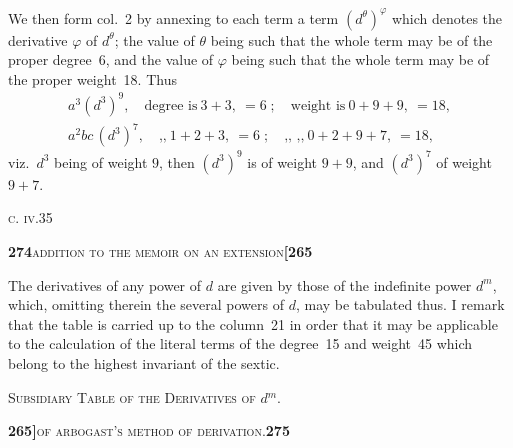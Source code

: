 \documentclass[11pt]{article}
\begin{document}
\medskip

\noindent We then form col.~2 by annexing to each term a term $(d^\theta)^\varphi$ which denotes the derivative $\varphi$ of $d^\theta$; the value of $\theta$ being such that the whole term may be of the proper degree~6, and the value of $\varphi$ being such that the whole term may be of the proper weight~18. Thus
\[
\begin{array}{l}
   a^3(d^3)^9,\quad \text{degree is}\ 3 + 3,\ =6\;;\quad \text{weight is}\ 0 + 9 + 9,\ =18,\\[3pt]
   a^2 b c\,(d^3)^7,\quad \text{,,}\ 1 + 2 + 3,\ =6\;;\quad \text{,, ,,}\ 0 + 2 + 9 + 7,\ =18,
\end{array}
\]
viz.\ $d^3$ being of weight $9$, then $(d^3)^9$ is of weight $9 + 9$, and $(d^3)^7$ of weight $9 + 7$.

\medskip

\noindent\textsc{c. iv.}\hfill 35

\newpage
\setcounter{page}{274}

\noindent\textbf{274}\hfill\textsc{addition to the memoir on an extension}\hfill\textbf{[265}

\medskip

\noindent The derivatives of any power of $d$ are given by those of the indefinite power $d^m$, which, omitting therein the several powers of $d$, may be tabulated thus. I remark that the table is carried up to the column~21 in order that it may be applicable to the calculation of the literal terms of the degree~15 and weight~45 which belong to the highest invariant of the sextic.

\medskip

\noindent\textsc{Subsidiary Table of the Derivatives of $d^m$.}

\medskip



\newpage
\setcounter{page}{275}

\noindent\textbf{265]}\hfill\textsc{of arbogast's method of derivation.}\hfill\textbf{275}

\medskip
\end{document}

